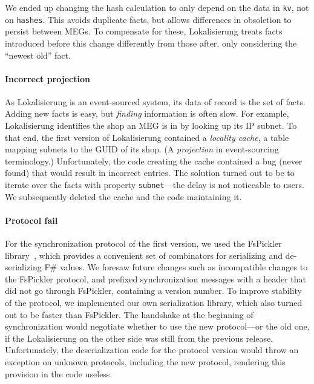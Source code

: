\documentclass[sigplan,review]{acmart}
\begin{document}
We ended up changing the hash calculation to only depend on the data
in \texttt{kv}, not on \texttt{hashes}.  This avoids duplicate facts,
but allows differences in obsoletion to persist between MEGs.  To
compensate for these, Lokalisierung treats facts introduced before
this change differently from those after, only considering the
``newest old'' fact.

\paragraph{Incorrect projection} As Lokalisierung is an event-sourced system,
its data of record is the set of facts. Adding new facts
is easy, but \emph{finding} information is often slow.
For example, Lokalisierung identifies the shop an MEG is in by looking
up its IP subnet. To that end, the first version of Lokalisierung
contained a \textit{locality cache}, a table mapping subnets to the
GUID of its shop.  (A \textit{projection} in
event-sourcing terminology.)  Unfortunately, the code creating the
cache contained a bug (never found) that would result in
incorrect entries. The solution turned out to be to iterate over the
facts with property \texttt{subnet}---the delay is not
noticeable to users. We subsequently deleted the cache and the code
maintaining it.

\paragraph{Protocol fail} For the synchronization protocol of the
first version, we used the FsPickler library~\cite{FsPickler}, which
provides a convenient set of combinators for serializing and
de-serializing F\# values.  We foresaw future changes such as
incompatible changes to the FsPickler protocol, and prefixed
synchronization messages with a header that did not go through
FsPickler, containing a version number.  To improve stability of the
protocol, we implemented our own serialization library, which also
turned out to be faster than FsPickler.  The handshake at the
beginning of synchronization would negotiate whether to use the new
protocol---or the old one, if the Lokalisierung on the other side was
still from the previous release. Unfortunately, the deserialization
code for the protocol version would throw an exception on unknown
protocols, including the new protocol, rendering this provision in
the code useless.

\end{document}
